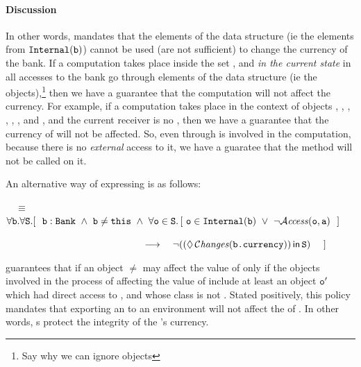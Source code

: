 \paragraph{Discussion}
In other words,   mandates that the elements of the data structure (ie the elements from ${\mbox{\tt{Internal}}}({\mbox{\tt{b}}})$) cannot be used (are not sufficient) to  change the currency of the bank. If a computation takes place inside the set , and {\em in the current state} in 
all accesses to the bank go through elements of the data structure (ie the  objects),\footnote{Say why we can ignore  objects} then we have a guarantee that the computation will not affect the currency.
For example, if a computation takes place in the context of objects , , , , , ,  and , and the current receiver is no , then we have a guarantee that the currency of  will not be affected. So, even through  is involved in the computation, because there is no {\em external} access to it, we have a guaratee that the method  will not be called on it.

An alternative way of expressing  is as follows:


 \ \  $\equiv$ \ \
  $\forall \prg{b}.\forall \prg{S}.
  [ \ \  \prg{b}:
  \prg{Bank}\ \wedge\   \prg{b}\neq\prg{this}\ \wedge\  \forall \prg{o} \in \prg{S}.\, [\ \prg{o}\in\prg{Internal}(\prg{b}) \ \vee\  \neg  \CanAccess{\prg{o}}{\prg{a}}  \ \ ]$
\\ \hfill \strut $~   \ \ \ \hspace{1.7in}  \  \ \longrightarrow \ \ \ \neg(
 \Using{(\Future\Changes{\prg{b.currency}})}{\prg{S}})\   \  \ \ ]$

\vspace{.01in}

\vspace{.01in}
  guarantees
that if an object $\neq$ may affect the value of  only if the  objects
involved in the process of affecting the value of \prg{b.Currency}  include at least an object ${\mbox{\tt{o}}}'$
which had direct access to \prg{b}, and
whose class is  not  . Stated positively, this policy mandates
that exporting an \prg{Account} to an environment will not affect the  of .
In other words,
s protect the integrity of the 's currency.


